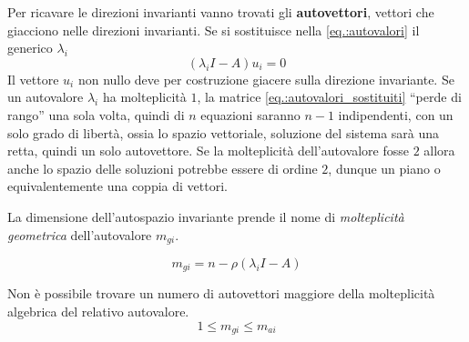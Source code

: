 Per ricavare le direzioni invarianti vanno trovati gli \textbf{autovettori},
vettori che giacciono nelle direzioni invarianti.
Se si sostituisce nella \ref{eq.:autovalori} il generico $\lambda_i$
\begin{equation}
(\lambda_i I -A)u_i = 0
\label{eq.:autovalori_sostituiti}
\end{equation}
Il vettore $u_i$ non nullo deve per costruzione giacere sulla direzione
invariante.
Se un autovalore $\lambda_i$ ha molteplicità $1$, la matrice
\ref{eq.:autovalori_sostituiti} ``perde  di rango'' una sola volta, quindi di
$n$ equazioni saranno $n-1$ indipendenti, con un solo grado di libertà, ossia
lo spazio vettoriale, soluzione del sistema sarà una retta, quindi un solo
autovettore.
Se la molteplicità dell'autovalore fosse $2$ allora anche lo spazio delle
soluzioni potrebbe essere di ordine $2$, dunque un piano o equivalentemente una
coppia di vettori.

La dimensione dell'autospazio invariante prende il nome di \textit{molteplicità
geometrica} dell'autovalore $m_{gi}$.

$$
m_{gi} = n - \rho(\lambda_i I -A)
$$

Non è possibile trovare un numero di autovettori maggiore della molteplicità
algebrica del relativo autovalore.
$$
1\leq m_{gi} \leq m_{ai}
$$
